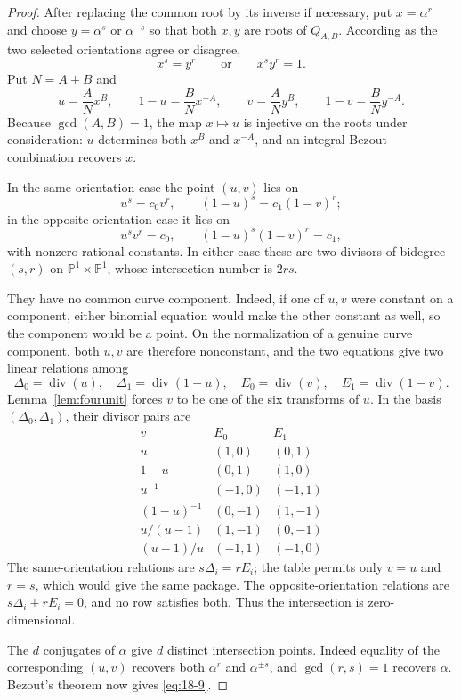 \documentclass[11pt]{article}
\numberwithin{equation}{section}
\theoremstyle{definition}
\begin{document}
\begin{proof}
After replacing the common root by its inverse if necessary, put
\(x=\alpha^r\) and choose \(y=\alpha^s\) or \(\alpha^{-s}\) so that both
\(x,y\) are roots of \(Q_{A,B}\).  According as the two selected
orientations agree or disagree,
\[
 x^s=y^r
 \qquad\text{or}\qquad
 x^sy^r=1.
\]
Put \(N=A+B\) and
\[
 u=\frac A N x^B,
 \qquad 1-u=\frac B N x^{-A},
 \qquad
 v=\frac A N y^B,
 \qquad 1-v=\frac B N y^{-A}.
\]
Because \(\gcd(A,B)=1\), the map \(x\mapsto u\) is injective on the roots
under consideration: \(u\) determines both \(x^B\) and \(x^{-A}\), and an
integral Bezout combination recovers \(x\).

In the same-orientation case the point \((u,v)\) lies on
\[
 u^s=c_0v^r,
 \qquad
 (1-u)^s=c_1(1-v)^r;
\]
in the opposite-orientation case it lies on
\[
 u^sv^r=c_0,
 \qquad
 (1-u)^s(1-v)^r=c_1,
\]
with nonzero rational constants.  In either case these are two divisors of
bidegree \((s,r)\) on \(\mathbb P^1\times\mathbb P^1\), whose intersection
number is \(2rs\).

They have no common curve component.  Indeed, if one of \(u,v\) were
constant on a component, either binomial equation would make the other
constant as well, so the component would be a point.  On the normalization
of a genuine curve component, both \(u,v\) are therefore nonconstant, and
the two equations give two
linear relations among
\[
 \Delta_0=\operatorname{div}(u),\quad
 \Delta_1=\operatorname{div}(1-u),\quad
 E_0=\operatorname{div}(v),\quad
 E_1=\operatorname{div}(1-v).
\]
Lemma~\ref{lem:fourunit} forces \(v\) to be one of the six transforms of
\(u\).  In the basis \((\Delta_0,\Delta_1)\), their divisor pairs are
\[
\begin{array}{c|cc}
 v&E_0&E_1\\ \hline
 u&(1,0)&(0,1)\\
 1-u&(0,1)&(1,0)\\
 u^{-1}&(-1,0)&(-1,1)\\
 (1-u)^{-1}&(0,-1)&(1,-1)\\
 u/(u-1)&(1,-1)&(0,-1)\\
 (u-1)/u&(-1,1)&(-1,0)
\end{array}
\]
The same-orientation relations are \(s\Delta_i=rE_i\); the table permits
only \(v=u\) and \(r=s\), which would give the same package.  The
opposite-orientation relations are
\(s\Delta_i+rE_i=0\), and no row satisfies both.  Thus the intersection is
zero-dimensional.

The \(d\) conjugates of \(\alpha\) give \(d\) distinct intersection points.
Indeed equality of the corresponding \((u,v)\) recovers both
\(\alpha^r\) and \(\alpha^{\pm s}\), and \(\gcd(r,s)=1\) recovers
\(\alpha\).  Bezout's theorem now gives \eqref{eq:18-9}.
\end{proof}
\end{document}

